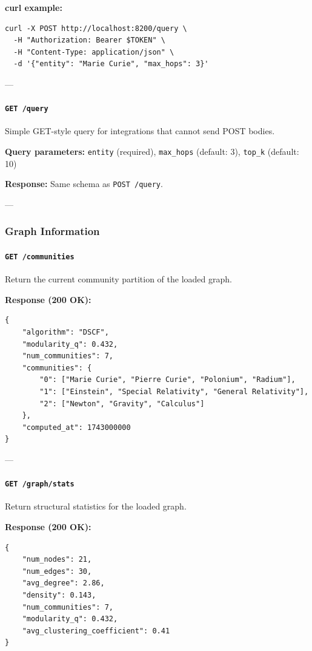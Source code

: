 \documentclass[11pt,article,oneside]{memoir}
\begin{document}
\textbf{curl example:}
\begin{lstlisting}
curl -X POST http://localhost:8200/query \
  -H "Authorization: Bearer $TOKEN" \
  -H "Content-Type: application/json" \
  -d '{"entity": "Marie Curie", "max_hops": 3}'
\end{lstlisting}

---

\paragraph{\texttt{GET /query}}
Simple GET-style query for integ\-rations that cannot send POST bodies.

\textbf{Query parameters:} \texttt{entity} (required), \texttt{max\_hops} (default: 3), \texttt{top\_k} (default: 10)

\textbf{Response:} Same schema as \texttt{POST /query}.

---

\subsubsection{Graph Information}

\paragraph{\texttt{GET /communities}}
Return the current community partition of the loaded graph.

\textbf{Response (200 OK):}
\begin{lstlisting}
{
    "algorithm": "DSCF",
    "modularity_q": 0.432,
    "num_communities": 7,
    "communities": {
        "0": ["Marie Curie", "Pierre Curie", "Polonium", "Radium"],
        "1": ["Einstein", "Special Relativity", "General Relativity"],
        "2": ["Newton", "Gravity", "Calculus"]
    },
    "computed_at": 1743000000
}
\end{lstlisting}

---

\paragraph{\texttt{GET /graph/stats}}
Return structural statistics for the loaded graph.

\textbf{Response (200 OK):}
\begin{lstlisting}
{
    "num_nodes": 21,
    "num_edges": 30,
    "avg_degree": 2.86,
    "density": 0.143,
    "num_communities": 7,
    "modularity_q": 0.432,
    "avg_clustering_coefficient": 0.41
}
\end{lstlisting}
\end{document}
